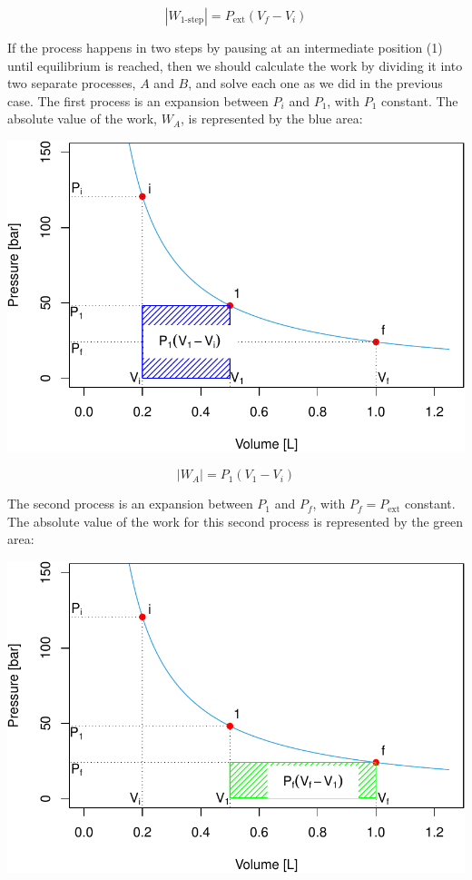 \documentclass[
  9pt,
]{extbook}
\theoremstyle{definition}
\theoremstyle{definition}
\theoremstyle{definition}
\theoremstyle{definition}
\theoremstyle{remark}
\begin{document}
\begin{equation}
\left| W_{\text{1-step}} \right| = P_{\text{ext}} (V_f-V_i)
  \label{eq:Warea1}
\end{equation}

If the process happens in two steps by pausing at an intermediate position (1) until equilibrium is reached, then we should calculate the work by dividing it into two separate processes, \(A\) and \(B\), and solve each one as we did in the previous case. The first process is an expansion between \(P_i\) and \(P_1\), with \(P_1\) constant. The absolute value of the work, \(W_A\), is represented by the blue area:

\begin{center}\includegraphics[width=0.7\linewidth]{pchem1_files/figure-latex/unnamed-chunk-4-1} \end{center}

\begin{equation}
\left| W_A \right| = P_1 (V_1-V_i)
  \label{eq:Warea2}
\end{equation}

The second process is an expansion between \(P_1\) and \(P_f\), with \(P_f=P_{\text{ext}}\) constant. The absolute value of the work for this second process is represented by the green area:

\begin{center}\includegraphics[width=0.7\linewidth]{pchem1_files/figure-latex/unnamed-chunk-5-1} \end{center}
\end{document}
